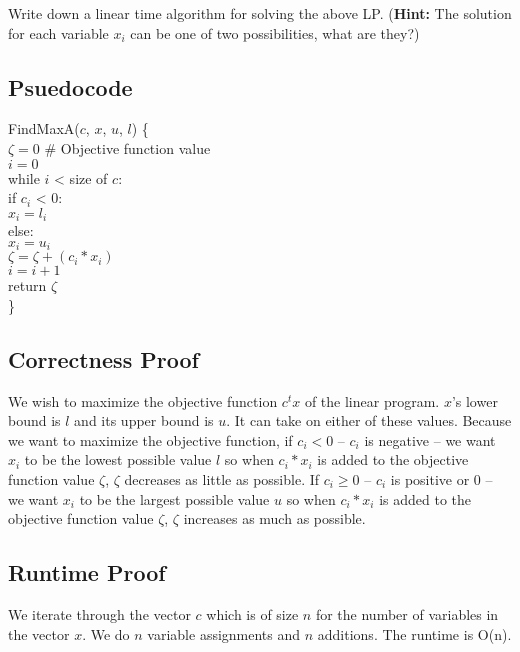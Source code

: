 \documentclass[11pt]{article}
\begin{document}
Write down a linear time algorithm for solving the above LP.
(\textbf{Hint:} The solution for each variable $x_i$ can be one of two
possibilities, what are they?)
\\
\subsection*{Psuedocode}
{\selectfont
FindMaxA($c$, $x$, $u$, $l$) \{\\
$\zeta = 0$ \# Objective function value\\
$i = 0$ \\
while $i$ < size of $c$:\\
\hspace*{1em} if $c_i$ < 0: \\
\hspace*{2em} $x_i = l_i$ \\
\hspace*{1em} else: \\
\hspace*{2em} $x_i = u_i$ \\
\hspace*{1em} $\zeta = \zeta + (c_i*x_i)$ \\
\hspace*{1em} $i = i + 1$ \\
return $\zeta$ \\
\}
}
\subsection*{Correctness Proof}
We wish to maximize the objective function $c^tx$ of the linear program.  $x$'s lower bound is $l$ and its upper bound is $u$.  It can take on either of these values.  Because we want to maximize the objective function, if $c_i < 0$ -- $c_i$ is negative -- we want $x_i$ to be the lowest possible value $l$ so when $c_i*x_i$ is added to the objective function value $\zeta$, $\zeta$ decreases as little as possible.  If $c_i \ge 0$ -- $c_i$ is positive or 0 -- we want $x_i$ to be the largest possible value $u$ so when $c_i*x_i$ is added to the objective function value $\zeta$, $\zeta$ increases as much as possible.
\subsection*{Runtime Proof}
We iterate through the vector $c$ which is of size $n$ for the number of variables in the vector $x$.  We do $n$ variable assignments and $n$ additions.  The runtime is O(n).
\end{document}
